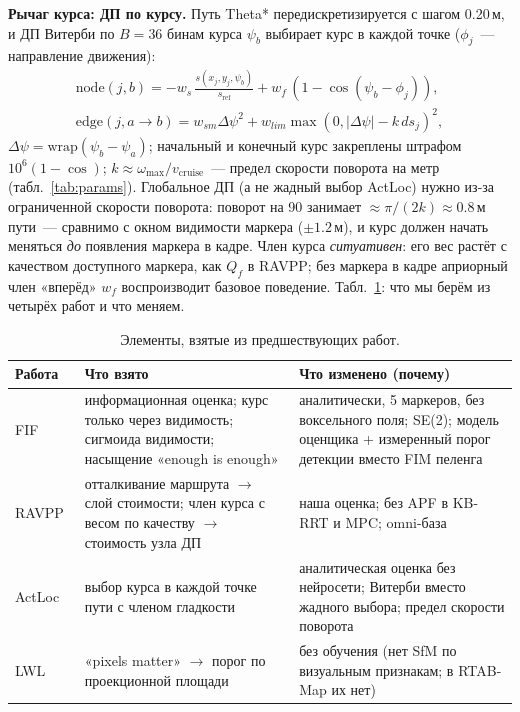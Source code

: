 \documentclass[10pt,twocolumn]{article}
\begin{document}
\textbf{Рычаг курса: ДП по курсу.} Путь Theta* передискретизируется с шагом 0.20\,м, и ДП Витерби по $B=36$ бинам курса $\psi_b$ выбирает курс в каждой точке ($\phi_j$~--- направление движения):
\begin{gather}
\mathrm{node}(j,b)=-w_s\,\frac{s(x_j,y_j,\psi_b)}{s_{\mathrm{ref}}}+w_f\,(1-\cos(\psi_b-\phi_j)),\nonumber\\
\mathrm{edge}(j,a{\to}b)=w_{sm}\Delta\psi^2+w_{lim}\max(0,|\Delta\psi|-k\,ds_j)^2,
\end{gather}
$\Delta\psi=\mathrm{wrap}(\psi_b-\psi_a)$; начальный и конечный курс закреплены штрафом $10^6(1-\cos)$; $k\approx\omega_{\max}/v_{\mathrm{cruise}}$~--- предел скорости поворота на метр (табл.~\ref{tab:params}).
Глобальное ДП (а не жадный выбор ActLoc) нужно из-за ограниченной скорости поворота: поворот на 90\textdegree{} занимает $\approx\pi/(2k)\approx0.8$\,м пути~--- сравнимо с окном видимости маркера ($\pm1.2$\,м), и курс должен начать меняться \emph{до} появления маркера в кадре.
Член курса \emph{ситуативен}: его вес растёт с качеством доступного маркера, как $Q_f$ в RAVPP; без маркера в кадре априорный член «вперёд» $w_f$ воспроизводит базовое поведение. Табл.~\ref{tab:papers}: что мы берём из четырёх работ и что меняем.
\begin{table}[t]
\centering\footnotesize
\caption{Элементы, взятые из предшествующих работ.}
\label{tab:papers}
\begin{tabularx}{\columnwidth}{@{}l>{\raggedright\arraybackslash}X>{\raggedright\arraybackslash}X@{}}
\toprule
Работа & Что взято & Что изменено (почему) \\
\midrule
FIF~\cite{fif} & информационная оценка; курс только через видимость; сигмоида видимости; насыщение «enough is enough» & аналитически, 5 маркеров, без воксельного поля; SE(2); модель оценщика + измеренный порог детекции вместо FIM пеленга \\
RAVPP~\cite{ravpp} & отталкивание маршрута $\to$ слой стоимости; член курса с весом по качеству $\to$ стоимость узла ДП & наша оценка; без APF в KB-RRT и MPC; omni-база \\
ActLoc~\cite{actloc} & выбор курса в каждой точке пути с членом гладкости & аналитическая оценка без нейросети; Витерби вместо жадного выбора; предел скорости поворота \\
LWL~\cite{lwl} & «pixels matter» $\to$ порог по проекционной площади & без обучения (нет SfM по визуальным признакам; в RTAB-Map их нет) \\
\bottomrule
\end{tabularx}
\end{table}
\end{document}
